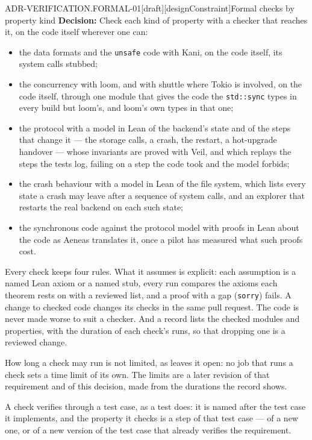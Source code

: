 \begin{requirement}{ADR-VERIFICATION.FORMAL-01}[draft][designConstraint]{Formal checks by property kind}
  \textbf{Decision:} Check each kind of property with a checker that reaches
  it, on the code itself wherever one can:
  \begin{itemize}
    \item the data formats and the \texttt{unsafe} code with Kani, on the
      code itself, its system calls stubbed;
    \item the concurrency with loom, and with shuttle where Tokio is
      involved, on the code itself, through one module that gives the code
      the \texttt{std::sync} types in every build but loom's, and loom's own
      types in that one;
    \item the protocol with a model in Lean of the backend's state and of the
      steps that change it --- the storage calls, a crash, the restart, a
      hot-upgrade handover --- whose invariants are proved with Veil, and
      which replays the steps the tests log, failing on a step the code took
      and the model forbids;
    \item the crash behaviour with a model in Lean of the file system, which
      lists every state a crash may leave after a sequence of system calls,
      and an explorer that restarts the real backend on each such state;
    \item the synchronous code against the protocol model with proofs in Lean
      about the code as Aeneas translates it, once a pilot has measured what
      such proofs cost.
  \end{itemize}
  Every check keeps four rules. What it assumes is explicit: each assumption
  is a named Lean axiom or a named stub, every run compares the axioms each
  theorem rests on with a reviewed list, and a proof with a gap
  (\texttt{sorry}) fails. A change to checked code changes its checks in the
  same pull request. The code is never made worse to suit a checker. And a
  record lists the checked modules and properties, with the duration of each
  check's runs, so that dropping one is a reviewed change.

  How long a check may run is not limited, as
   leaves it open: no job that runs a
  check sets a time limit of its own. The limits are a later revision of
  that requirement and of this decision, made from the durations the record
  shows.

  A check verifies through a test case, as a test does: it is named after
  the test case it implements, and the property it checks is a step of that
  test case --- of a new one, or of a new version of the test case that
  already verifies the requirement.


\end{requirement}
